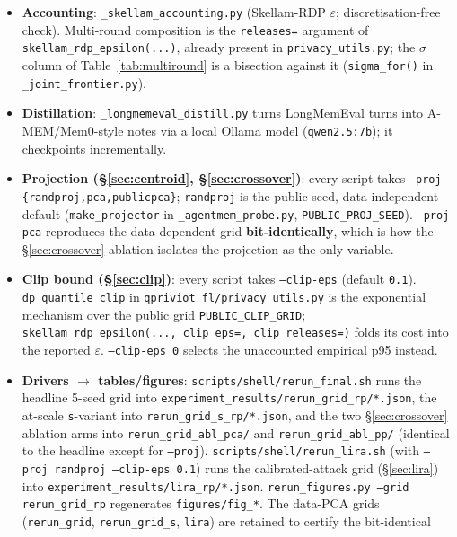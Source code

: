 \documentclass[pdflatex,sn-mathphys-num,12pt]{sn-jnl}
\theoremstyle{thmstyleone}%
\theoremstyle{thmstyletwo}%
\theoremstyle{thmstylethree}%
\newcommand{\eps}{\varepsilon}
\newcommand{\secref}[1]{\S\ref{#1}}
\begin{document}
\begin{appendices}
\begin{itemize}
  \item \textbf{Accounting}: \texttt{\_skellam\_accounting.py} (Skellam-RDP $\eps$;
    discretisation-free check). Multi-round composition is the \texttt{releases=} argument of
    \texttt{skellam\_rdp\_epsilon(...)}, already present in \texttt{privacy\_utils.py}; the
    $\sigma$ column of Table~\ref{tab:multiround} is a bisection against it
    (\texttt{sigma\_for()} in \texttt{\_joint\_frontier.py}).
  \item \textbf{Distillation}: \texttt{\_longmemeval\_distill.py} turns LongMemEval turns into
    A-MEM/Mem0-style notes via a local Ollama model (\texttt{qwen2.5:7b}); it checkpoints
    incrementally.
  \item \textbf{Projection (\secref{sec:centroid}, \secref{sec:crossover})}: every script takes
    \texttt{--proj \{randproj,pca,publicpca\}}; \texttt{randproj} is the public-seed,
    data-independent default (\texttt{make\_projector} in \texttt{\_agentmem\_probe.py},
    \texttt{PUBLIC\_PROJ\_SEED}). \texttt{--proj pca} reproduces the data-dependent grid
    \textbf{bit-identically}, which is how the \secref{sec:crossover} ablation isolates the projection
    as the only variable.
  \item \textbf{Clip bound (\secref{sec:clip})}: every script takes \texttt{--clip-eps} (default
    \texttt{0.1}). \texttt{dp\_quantile\_clip} in \texttt{qpriviot\_fl/privacy\_utils.py} is the
    exponential mechanism over the public grid \texttt{PUBLIC\_CLIP\_GRID};
    \texttt{skellam\_rdp\_epsilon(..., clip\_eps=, clip\_releases=)} folds its cost into the reported
    $\eps$. \texttt{--clip-eps 0} selects the unaccounted empirical p95 instead.
  \item \textbf{Drivers $\to$ tables/figures}: \texttt{scripts/shell/rerun\_final.sh} runs the headline
    5-seed grid into \texttt{experiment\_results/rerun\_grid\_rp/*.json}, the at-scale
    \texttt{s}-variant into \texttt{rerun\_grid\_s\_rp/*.json}, and the two \secref{sec:crossover}
    ablation arms into \texttt{rerun\_grid\_abl\_pca/} and \texttt{rerun\_grid\_abl\_pp/} (identical to
    the headline except for \texttt{--proj}). \texttt{scripts/shell/rerun\_lira.sh} (with
    \texttt{--proj randproj --clip-eps 0.1}) runs the calibrated-attack grid (\secref{sec:lira}) into
    \texttt{experiment\_results/lira\_rp/*.json}. \texttt{rerun\_figures.py --grid rerun\_grid\_rp}
    regenerates \texttt{figures/fig\_*}. The data-PCA grids (\texttt{rerun\_grid},
    \texttt{rerun\_grid\_s}, \texttt{lira}) are retained to certify the bit-identical

\end{itemize}
\end{appendices}
\end{document}
